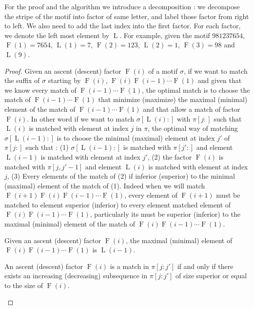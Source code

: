 \documentclass[a4paper]{llncs}
\newcommand{\ptext}{\pi}
\newcommand{\pmotif}{\sigma}
\DeclareMathOperator{\firsta}{L}
\newcommand{\first}[1]{\firsta({#1})}
\DeclareMathOperator{\factora}{F}
\newcommand{\factor}[1]{\factora({#1})}
\begin{document}
			
For the proof and the algorithm we introduce a decomposition : we decompose the stripe of the motif into factor of same letter, and label those factor from right to left. We also need to add the last index into the first factor. For each factor, we denote the left most element by $\firsta$. For example, given the motif $981237654$, $\factor{1} =7654$, $\first{1}=7$, $\factor{2}=123$, $\first{2}=1$, $\factor{3}=98$ and $\first{9}$. \\
			
\begin{proof}
Given an ascent (descent) factor $\factor{i}$ of a motif $\pmotif$, if we want to match the suffix of $\pmotif$ starting by $\factor{i}$, $\factor{i}\factor{i-1}\cdots\factor{1}$ and given that we know every match of $\factor{i-1}\cdots\factor{1}$, the optimal match is to choose the match of $\factor{i-1}\cdots\factor{1}$ that minimize (maximize) the maximal (minimal) element of the match of $\factor{i-1}\cdots\factor{1}$ and that allow a match of factor $\factor{i}$. In other word if we want to match $\pmotif[\first{i}:]$ with $\ptext[j:]$ such that $\first{i}$ is matched with element at index $j$ in $\ptext$, the optimal way of matching $\pmotif[\first{i-1}:]$ is to choose the minimal (maximal) element at index $j'$ of $\ptext[j:]$ such that : (1) $\pmotif[\first{i-1}:]$ is matched with $\ptext[j':]$ and element $\first{i-1}$ is matched with element at index $j'$, (2) the factor $\factor{i}$ is matched with $\ptext[j,j'-1]$ and element $\first{i}$ is matched with element at index $j$, (3) Every elements of the match of (2) if inferior (superior) to the minimal (maximal) element of the match of (1). Indeed when we will match $\factor{i+1}\factor{i}\factor{i-1}\cdots\factor{1}$, every element of $\factor{i+1}$ must be matched to element superior (inferior) to every element matched element of $\factor{i}\factor{i-1}\cdots\factor{1}$, particularly its must be superior (inferior) to the maximal (minimal) element of the match of $\factor{i}\factor{i-1}\cdots\factor{1}$.
		
\begin{remark}
Given an ascent (descent) factor $\factor{i}$, the maximal (minimal) element of $\factor{i}\factor{i-1}\cdots\factor{1}$ is $\first{i-1}$.			  
\end{remark}		

\begin{remark}
An ascent (descent) factor 	$\factor{i}$ is a match in $\ptext[j:j']$  if and only if there exists an increasing (decreasing) subsequence in $\ptext[j:j']$ of size superior or equal to the size of $\factor{i}$.		  
\end{remark}
			

\end{proof}
\end{document}
